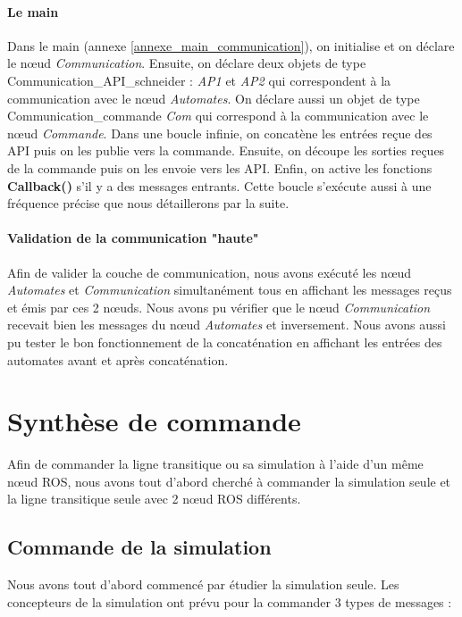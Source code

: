 \documentclass[a4paper,french, titlepage]{book}
\begin{document}
\subsubsection{Le main}

Dans le main (annexe \ref{annexe_main_communication}), on initialise et on déclare le nœud \textit{Communication}. Ensuite, on déclare deux objets de type Communication\_API\_schneider : \emph{AP1} et \emph{AP2} qui correspondent à la communication avec le nœud \emph{Automates}. On déclare aussi un objet de type Communication\_commande \emph{Com} qui correspond à la communication avec le nœud \emph{Commande}. Dans une boucle infinie, on concatène les entrées reçue des API puis on les publie vers la commande. Ensuite, on découpe les sorties reçues de la commande puis on les envoie vers les API. Enfin, on active les fonctions \textbf{Callback()} s'il y a des messages entrants. Cette boucle s'exécute aussi à une fréquence précise que nous détaillerons par la suite. 

\subsubsection{Validation de la communication "haute"}

Afin de valider la couche de communication, nous avons exécuté les nœud \emph{Automates} et \emph{Communication} simultanément tous en affichant les messages reçus et émis par ces 2 nœuds. Nous avons pu vérifier que le nœud \emph{Communication} recevait bien les messages du nœud \emph{Automates} et inversement. Nous avons aussi pu tester le bon fonctionnement de la concaténation en affichant les entrées des automates avant et après concaténation.

\chapter{Synthèse de commande}

Afin de commander la ligne transitique ou sa simulation à l'aide d'un même nœud ROS, nous avons tout d'abord cherché à commander la simulation seule et la ligne transitique seule avec 2 nœud ROS différents.

\section{Commande de la simulation}

Nous avons tout d'abord commencé par étudier la simulation seule. Les concepteurs de la simulation ont prévu pour la commander 3 types de messages :
\end{document}
